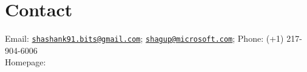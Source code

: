     
\section{\mysidestyle Contact}
Email: \href{mailto:shashank91.bits@gmail.com}{\nolinkurl{shashank91.bits@gmail.com}}; \href{mailto:shagup@microsoft.com}{\nolinkurl{shagup@microsoft.com}}; \hfill Phone: (+1) 217-904-6006 \vspace{0mm}\\\vspace{0mm}%
Homepage: 
    \vspace{0mm}\\\vspace{-4.5mm}%
